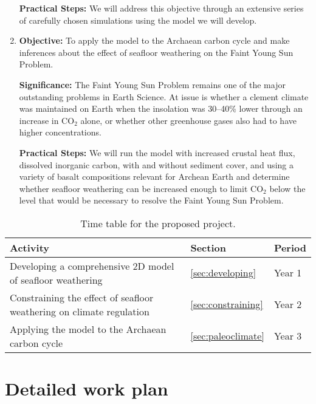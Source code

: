 \documentclass[authoryear,round,12pt]{article}
\begin{document}
\begin{enumerate}
  \textbf{Practical Steps:} We will address this objective through an
  extensive series of carefully chosen simulations using the model we
  will develop.

\item \textbf{Objective:} To apply the model to the Archaean carbon
  cycle and make inferences about the effect of seafloor weathering on
  the Faint Young Sun Problem.

  \textbf{Significance:} The Faint Young Sun Problem remains one of
  the major outstanding problems in Earth Science. At issue is whether
  a clement climate was maintained on Earth when the insolation was
  30--40\% lower through an increase in CO$_2$ alone, or whether other
  greenhouse gases also had to have higher concentrations. 

  \textbf{Practical Steps:} We will run the model with increased
  crustal heat flux, dissolved inorganic carbon, with and without sediment cover, and using a variety of
  basalt compositions relevant for Archean Earth and determine whether
  seafloor weathering can be increased enough to limit CO$_2$ below
  the level that would be necessary to resolve the Faint Young Sun
  Problem. 



\end{enumerate}


\begin{table}[!h]
\caption{Time table for the proposed project.}\label{table:time-table} 
\begin{center}
  \begin{tabular}{lll}
 \hline
 Activity                        & Section                               & Period  \\
  \hline
Developing a comprehensive 2D model of seafloor weathering    & \ref{sec:developing}                 & Year 1  \\
Constraining the effect of seafloor weathering on climate regulation & \ref{sec:constraining}  & Year 2 \\
Applying the model to the Archaean carbon cycle & \ref{sec:paleoclimate} & Year 3 
\end{tabular}
\end{center}
\end{table}


\section{Detailed work plan}
\label{sec:detailed-work-plan}
\end{document}
